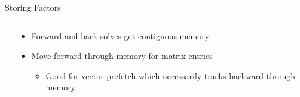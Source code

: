 \begin{frame}{Storing Factors}
\begin{columns}
\begin{column}{0.3\textwidth}
    \end{column}
    \begin{column}{0.7\textwidth}
      \begin{itemize}
      \item Forward and back solves get contiguous memory
      \item Move forward through memory for matrix entries
        \begin{itemize}
        \item Good for vector prefetch which necessarily tracks backward through memory
        \end{itemize}
      \end{itemize}
    \end{column}
  \end{columns}
\end{frame}
